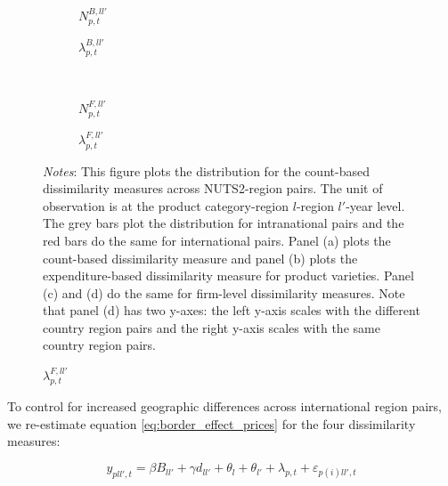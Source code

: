 \begin{figure}
    \centering
    \caption{Choice set dissimilarity}
    \label{fig: redform_choice}
    \begin{subfigure}[t]{.49\textwidth}
         \centering
         \caption{$N^{B,ll'}_{p,t}$}
         \label{fig: redform_bar_c}
         \scalebox{0.45}{}
     \end{subfigure}
     \begin{subfigure}[t]{.49\textwidth}
         \centering
         \caption{$\lambda^{B,ll'}_{p,t}$}
         \label{fig: redform_bar_e}
         \scalebox{0.45}{}
     \end{subfigure} \\
     \begin{subfigure}[t]{.49\textwidth}
        \centering
        \caption{$N^{F,ll'}_{p,t}$}
        \label{fig: redform_firm_c}
        \scalebox{0.45}{}
    \end{subfigure}
    \begin{subfigure}[t]{.49\textwidth}
        \centering
        \caption{$\lambda^{F,ll'}_{p,t}$}
        \label{fig: redform_firm_e}
        \scalebox{0.45}{}
    \end{subfigure}
     \parbox{\textwidth}{
        \begin{spacing}{1} 
            {\footnotesize 
            \textit{Notes}: This figure plots the distribution for the count-based dissimilarity measures across NUTS2-region pairs. The unit of observation is at the product category-region $l$-region $l'$-year level. The grey bars plot the distribution for intranational pairs and the red bars do the same for international pairs. Panel (a) plots the count-based dissimilarity measure and panel (b) plots the expenditure-based dissimilarity measure for product varieties. Panel (c) and (d) do the same for firm-level dissimilarity measures. Note that panel (d) has two y-axes: the left y-axis scales with the different country region pairs and the right y-axis scales with the same country region pairs. }
        \end{spacing}}
\end{figure} 
To control for increased geographic differences across international region pairs, we re-estimate equation \ref{eq:border_effect_prices} for the four dissimilarity measures: 
\begin{linenomath*}
\begin{equation}\label{eq:border_effect_barcodes}
    y_{pll',t} = \beta B_{ll'} + \gamma d_{ll'} + \theta_l + \theta_{l'} +
                    \lambda_{p,t} + \varepsilon_{p(i)ll',t}
\end{equation}
\end{linenomath*}
